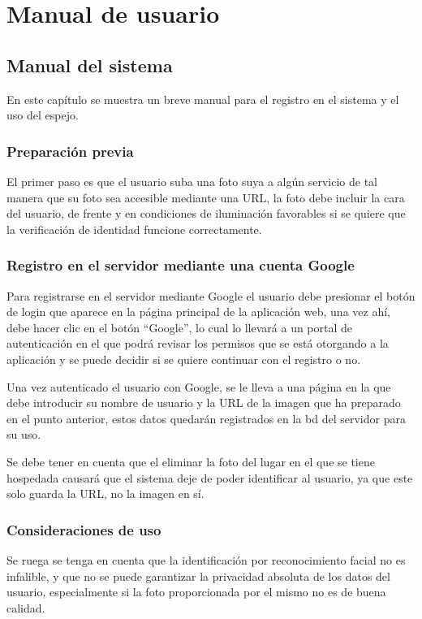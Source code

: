 \chapter{Manual de usuario}

\section{Manual del sistema}

En este capítulo se muestra un breve manual para el registro en el sistema y el uso del espejo.

\subsection{Preparación previa}

El primer paso es que el usuario suba una foto suya a algún servicio de tal manera que su foto sea accesible mediante una URL, la foto debe incluir la cara del usuario, de frente y en condiciones de iluminación favorables si se quiere que la verificación de identidad funcione correctamente.

\subsection{Registro en el servidor mediante una cuenta Google}

Para registrarse en el servidor mediante Google el usuario debe presionar el botón de login que aparece en la página principal de la aplicación web, una vez ahí, debe hacer clic en el botón “Google”, lo cual lo llevará a un portal de autenticación en el que podrá revisar los permisos que se está otorgando a la aplicación y se puede decidir si se quiere continuar con el registro o no.

Una vez autenticado el usuario con Google, se le lleva a una página en la que debe introducir su nombre de usuario y la URL de la imagen que ha preparado en el punto anterior, estos datos quedarán registrados en la \acrshort{bd} del servidor para su uso.

Se debe tener en cuenta que el eliminar la foto del lugar en el que se tiene hospedada causará que el sistema deje de poder identificar al usuario, ya que este solo guarda la URL, no la imagen en sí.

\subsection{Consideraciones de uso}

Se ruega se tenga en cuenta que la identificación por reconocimiento facial no es infalible, y que no se puede garantizar la privacidad absoluta de los datos del usuario, especialmente si la foto proporcionada por el mismo no es de buena calidad.